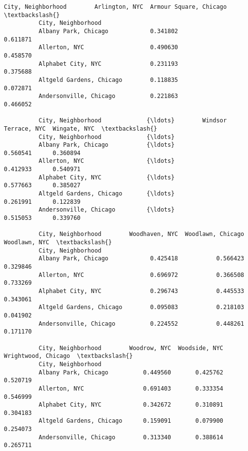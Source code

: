 \documentclass[11pt]{article}
\begin{document}
\begin{Verbatim}[commandchars=\\\{\}]
          City, Neighborhood        Arlington, NYC  Armour Square, Chicago  \textbackslash{}
          City, Neighborhood                                                 
          Albany Park, Chicago            0.341802                0.611871   
          Allerton, NYC                   0.490630                0.458570   
          Alphabet City, NYC              0.231193                0.375688   
          Altgeld Gardens, Chicago        0.118835                0.072871   
          Andersonville, Chicago          0.221863                0.466052   
          
          City, Neighborhood             {\ldots}        Windsor Terrace, NYC  Wingate, NYC  \textbackslash{}
          City, Neighborhood             {\ldots}                                             
          Albany Park, Chicago           {\ldots}                    0.560541      0.360894   
          Allerton, NYC                  {\ldots}                    0.412933      0.540971   
          Alphabet City, NYC             {\ldots}                    0.577663      0.385027   
          Altgeld Gardens, Chicago       {\ldots}                    0.261991      0.122839   
          Andersonville, Chicago         {\ldots}                    0.515053      0.339760   
          
          City, Neighborhood        Woodhaven, NYC  Woodlawn, Chicago  Woodlawn, NYC  \textbackslash{}
          City, Neighborhood                                                           
          Albany Park, Chicago            0.425418           0.566423       0.329846   
          Allerton, NYC                   0.696972           0.366508       0.733269   
          Alphabet City, NYC              0.296743           0.445533       0.343061   
          Altgeld Gardens, Chicago        0.095083           0.218103       0.041902   
          Andersonville, Chicago          0.224552           0.448261       0.171170   
          
          City, Neighborhood        Woodrow, NYC  Woodside, NYC  Wrightwood, Chicago  \textbackslash{}
          City, Neighborhood                                                           
          Albany Park, Chicago          0.449560       0.425762             0.520719   
          Allerton, NYC                 0.691403       0.333354             0.546999   
          Alphabet City, NYC            0.342672       0.310891             0.304183   
          Altgeld Gardens, Chicago      0.159091       0.079900             0.254073   
          Andersonville, Chicago        0.313340       0.388614             0.265711   
          

\end{Verbatim}
\end{document}
